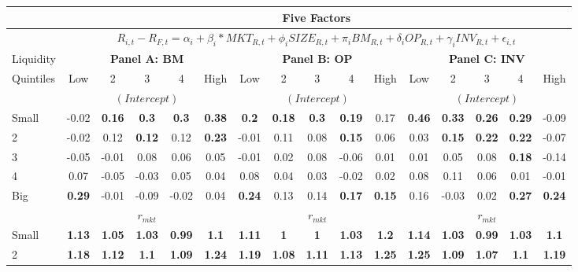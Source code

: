 \begin{table}[H]
\tiny
\centering
\begin{tabular}{lccccc|ccccc|ccccc}
\hline
& \multicolumn{15}{c}{Five Factors} \\ \hline
& \multicolumn{15}{c}{\tiny $R_{i,t} - R_{F,t} = \alpha_i+\beta_i*MKT_{R,t} + \phi_iSIZE_{R,t}+\pi_iBM_{R,t} + \delta_iOP_{R,t}+\gamma_iINV_{R,t} + \epsilon_{i,t}$} \\ \hline
Liquidity & \multicolumn{5}{c|}{\textbf{Panel A: BM}} & \multicolumn{5}{c|}{\textbf{Panel B: OP}} & \multicolumn{5}{c}{\textbf{Panel C: INV}} \\
Quintiles & Low & 2 & 3 & 4 & High & Low & 2 & 3 & 4 & High & Low & 2 & 3 & 4 & High \\  \hline
 & \multicolumn{5}{c|}{$(Intercept)$} & \multicolumn{5}{c|}{$(Intercept)$} & \multicolumn{5}{c}{$(Intercept)$} \\
Small & -0.02 & \textbf{0.16} & \textbf{0.3} & \textbf{0.3} & \textbf{0.38} & \textbf{0.2} & \textbf{0.18} & \textbf{0.3} & \textbf{0.19} & 0.17 & \textbf{0.46} & \textbf{0.33} & \textbf{0.26} & \textbf{0.29} & -0.09 \\
2 & -0.02 & 0.12 & \textbf{0.12} & 0.12 & \textbf{0.23} & -0.01 & 0.11 & 0.08 & \textbf{0.15} & 0.06 & 0.03 & \textbf{0.15} & \textbf{0.22} & \textbf{0.22} & -0.07 \\
3 & -0.05 & -0.01 & 0.08 & 0.06 & 0.05 & -0.01 & 0.02 & 0.08 & -0.06 & 0.01 & 0.01 & 0.05 & 0.08 & \textbf{0.18} & -0.14 \\
4 & 0.07 & -0.05 & -0.03 & 0.05 & 0.04 & 0.08 & 0.04 & 0.03 & -0.02 & 0.02 & 0.08 & 0.11 & 0.06 & 0.01 & -0.01 \\
Big & \textbf{0.29} & -0.01 & -0.09 & -0.02 & 0.04 & \textbf{0.24} & 0.13 & 0.14 & \textbf{0.17} & \textbf{0.15} & 0.16 & -0.03 & 0.02 & \textbf{0.27} & \textbf{0.24} \\
 & \multicolumn{5}{c|}{$r_{mkt}$} & \multicolumn{5}{c|}{$r_{mkt}$} & \multicolumn{5}{c}{$r_{mkt}$} \\
Small & \textbf{1.13} & \textbf{1.05} & \textbf{1.03} & \textbf{0.99} & \textbf{1.1} & \textbf{1.11} & \textbf{1} & \textbf{1} & \textbf{1.03} & \textbf{1.2} & \textbf{1.14} & \textbf{1.03} & \textbf{0.99} & \textbf{1.03} & \textbf{1.1} \\
2 & \textbf{1.18} & \textbf{1.12} & \textbf{1.1} & \textbf{1.09} & \textbf{1.24} & \textbf{1.19} & \textbf{1.08} & \textbf{1.11} & \textbf{1.13} & \textbf{1.25} & \textbf{1.25} & \textbf{1.09} & \textbf{1.07} & \textbf{1.1} & \textbf{1.19} \\

\end{tabular}
\end{table}
